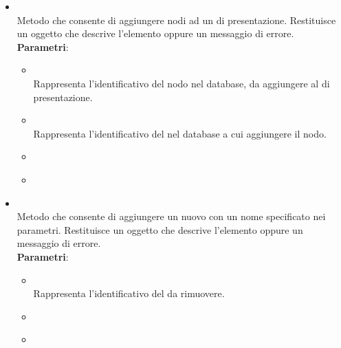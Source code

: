 \begin{itemize}
\begin{itemize}
\begin{itemize}
\\ \dpCallback
\item {}
\\ \dpErrBack
\end{itemize}
\item {}
\\ Metodo che consente di aggiungere nodi ad un  di presentazione. Restituisce un oggetto  che descrive l’elemento oppure un messaggio di errore.
\\ \textbf{Parametri}:
\begin{itemize}
\item {}
\\ Rappresenta l'identificativo del nodo nel database, da aggiungere al  di presentazione.
\item {}
\\ Rappresenta l'identificativo del  nel database a cui aggiungere il nodo.
\item {}
\\ \dpCallback
\item {}
\\ \dpErrBack
\end{itemize}
\item {}
\\ Metodo che consente di aggiungere un nuovo  con un nome specificato nei parametri. Restituisce un oggetto  che descrive l’elemento oppure un messaggio di errore.
\\ \textbf{Parametri}:
\begin{itemize}
\item {}
\\ Rappresenta l’identificativo del  da rimuovere.
\item {}
\\ \dpCallback
\item {}
\\ \dpErrBack
\end{itemize}

\end{itemize}
\end{itemize}
